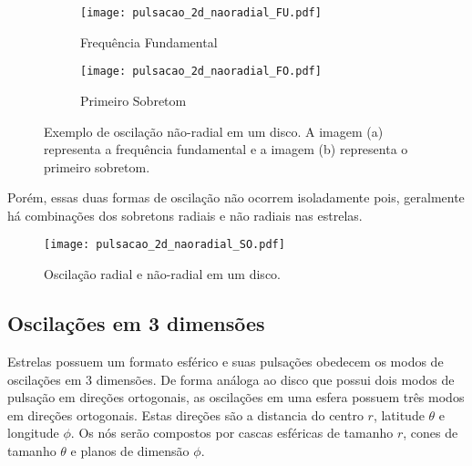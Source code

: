 \begin{figure}[htb!]
\centering
\begin{subfigure}{.33\textwidth}
  \centering
  \texttt{[image: pulsacao\_2d\_naoradial\_FU.pdf]}
  \caption{Frequência Fundamental}
\end{subfigure}%
\hspace{2mm}
\begin{subfigure}{.33\textwidth}
  \centering
  \texttt{[image: pulsacao\_2d\_naoradial\_FO.pdf]}
  \caption{Primeiro Sobretom}
\end{subfigure}
\caption[Oscilação não-radial em um disco.]{Exemplo de oscilação não-radial em um disco. A imagem (a) representa a frequência fundamental e a imagem (b) representa o primeiro sobretom.}
\label{fig:disco_naoradial}
\end{figure}

Porém, essas duas formas de oscilação não ocorrem isoladamente pois, geralmente há combinações dos sobretons radiais e não radiais nas estrelas.
\begin{figure}[h]
\center
\texttt{[image: pulsacao\_2d\_naoradial\_SO.pdf]}
\caption{Oscilação radial e não-radial em um disco.}
\end{figure}

\subsection{Oscilações em 3 dimensões}
Estrelas possuem um formato esférico e suas pulsações obedecem os modos de oscilações em 3 dimensões.
De forma análoga ao disco que possui dois modos de pulsação em direções ortogonais, as oscilações em uma esfera possuem três modos  em direções ortogonais. Estas direções são a distancia do centro $r$, latitude $\theta$ e longitude $\phi$. Os nós serão compostos por cascas esféricas de tamanho $r$, cones de tamanho $\theta$ e planos de dimensão $\phi$.

